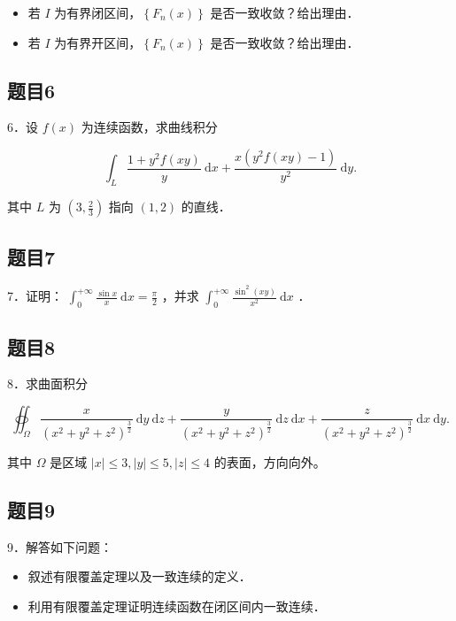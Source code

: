 \documentclass{article}
\begin{document}
\begin{itemize}
  \item[（1）] 若 \(I\) 为有界闭区间，\(\left\{F_{n}(x)\right\}\) 是否一致收敛？给出理由．
  \item[（2）] 若 \(I\) 为有界开区间，\(\left\{F_{n}(x)\right\}\) 是否一致收敛？给出理由．
\end{itemize}

\subsection{题目6}
6．设 \(f(x)\) 为连续函数，求曲线积分

\[
\int_{L} \frac{1+y^{2} f(x y)}{y} \mathrm{~d} x+\frac{x\left(y^{2} f(x y)-1\right)}{y^{2}} \mathrm{~d} y .
\]

其中 \(L\) 为 \(\left(3, \frac{2}{3}\right)\) 指向 \((1,2)\) 的直线．

\subsection{题目7}
7．证明： \(\int_{0}^{+\infty} \frac{\sin x}{x} \mathrm{~d} x=\frac{\pi}{2}\) ，并求 \(\int_{0}^{+\infty} \frac{\sin ^{2}(x y)}{x^{2}} \mathrm{~d} x\) ．

\subsection{题目8}
8．求曲面积分

\[
\oiint_{\Omega} \frac{x}{\left(x^{2}+y^{2}+z^{2}\right)^{\frac{3}{2}}} \mathrm{~d} y \mathrm{~d} z+\frac{y}{\left(x^{2}+y^{2}+z^{2}\right)^{\frac{3}{2}}} \mathrm{~d} z \mathrm{~d} x+\frac{z}{\left(x^{2}+y^{2}+z^{2}\right)^{\frac{3}{2}}} \mathrm{~d} x \mathrm{~d} y .
\]

其中 \(\Omega\) 是区域 \(|x| \leq 3,|y| \leq 5,|z| \leq 4\) 的表面，方向向外。

\subsection{题目9}
9．解答如下问题：

\begin{itemize}
  \item[（1）] 叙述有限覆盖定理以及一致连续的定义．
  \item[（2）] 利用有限覆盖定理证明连续函数在闭区间内一致连续．
\end{itemize}
\end{document}
